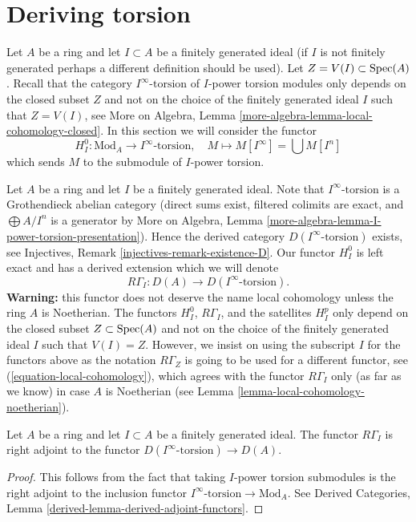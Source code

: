 \section{Deriving torsion}
\label{section-bad-local-cohomology}

\noindent
Let $A$ be a ring and let $I \subset A$ be a finitely generated ideal
(if $I$ is not finitely generated perhaps a different definition
should be used). Let $Z = V(I) \subset \mathop{\mathrm{Spec}}(A)$. Recall that the
category $I^\infty\text{-torsion}$ of $I$-power torsion modules
only depends on the closed subset $Z$ and not on the choice of the
finitely generated ideal $I$ such that $Z = V(I)$, see
More on Algebra, Lemma \ref{more-algebra-lemma-local-cohomology-closed}.
In this section we will consider the functor
$$
H^0_{I} : \text{Mod}_A \longrightarrow I^\infty\text{-torsion},\quad
M \longmapsto M[I^\infty] = \bigcup M[I^n]
$$
which sends $M$ to the submodule of $I$-power torsion.

\medskip\noindent
Let $A$ be a ring and let $I$ be a finitely generated ideal.
Note that $I^\infty\text{-torsion}$ is a Grothendieck
abelian category (direct sums exist, filtered colimits are
exact, and $\bigoplus A/I^n$ is a generator by
More on Algebra, Lemma \ref{more-algebra-lemma-I-power-torsion-presentation}).
Hence the derived category $D(I^\infty\text{-torsion})$ exists, see
Injectives, Remark \ref{injectives-remark-existence-D}.
Our functor $H^0_I$ is left exact and has a derived extension
which we will denote
$$
R\Gamma_I : D(A) \longrightarrow D(I^\infty\text{-torsion}).
$$
{\bf Warning:} this functor does not deserve the name
local cohomology unless the ring $A$ is Noetherian.
The functors $H^0_I$, $R\Gamma_I$, and the satellites $H^p_I$
only depend on the closed subset $Z \subset \mathop{\mathrm{Spec}}(A)$ and not
on the choice of the finitely generated ideal $I$ such that
$V(I) = Z$. However, we insist on using the subscript $I$ for
the functors above as the notation $R\Gamma_Z$ is going
to be used for a different functor, see
(\ref{equation-local-cohomology}), which
agrees with the functor $R\Gamma_I$ only (as far as we know)
in case $A$ is Noetherian
(see Lemma \ref{lemma-local-cohomology-noetherian}).

\begin{lemma}
\label{lemma-adjoint}
Let $A$ be a ring and let $I \subset A$ be a finitely generated ideal.
The functor $R\Gamma_I$ is right adjoint to the functor
$D(I^\infty\text{-torsion}) \to D(A)$.
\end{lemma}

\begin{proof}
This follows from the fact that taking $I$-power torsion submodules
is the right adjoint to the inclusion functor
$I^\infty\text{-torsion} \to \text{Mod}_A$. See
Derived Categories, Lemma \ref{derived-lemma-derived-adjoint-functors}.
\end{proof}

